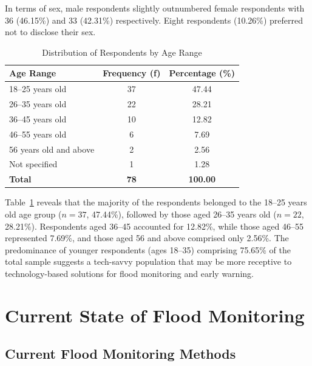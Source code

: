 \documentclass{research}
\begin{document}
In terms of sex, male respondents slightly outnumbered female respondents with 36
(46.15\%) and 33 (42.31\%) respectively. Eight respondents (10.26\%) preferred not to
disclose their sex. 
 
\begin{table}[htbp]
\centering
\small
\caption{Distribution of Respondents by Age Range}
\label{tab:age}
\begin{tabular}{p{7cm}|c|c}
\hline
\textbf{Age Range} & \textbf{Frequency (f)} & \textbf{Percentage (\%)} \\
\hline
18--25 years old        & 37 & 47.44 \\
26--35 years old        & 22 & 28.21 \\
36--45 years old        & 10 & 12.82 \\
46--55 years old        &  6 &  7.69 \\
56 years old and above  &  2 &  2.56 \\
Not specified           &  1 &  1.28 \\
\hline
\textbf{Total}          & \textbf{78} & \textbf{100.00} \\
\hline
\end{tabular}
\end{table}
 
Table~\ref{tab:age} reveals that the majority of the respondents belonged to the 18--25
years old age group ($n=37$, 47.44\%), followed by those aged 26--35 years old
($n=22$, 28.21\%). Respondents aged 36--45 accounted for 12.82\%, while those aged
46--55 represented 7.69\%, and those aged 56 and above comprised only 2.56\%. The
predominance of younger respondents (ages 18--35) comprising 75.65\% of the total
sample suggests a tech-savvy population that may be more receptive to
technology-based solutions for flood monitoring and early warning.
 
\section{Current State of Flood Monitoring}
 
\subsection{Current Flood Monitoring Methods}
 
\end{document}
